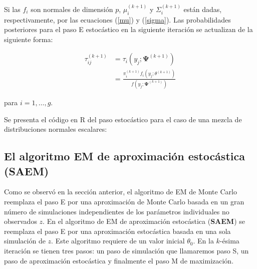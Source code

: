 \documentclass[
]{article}
\newenvironment{Shaded}{\begin{snugshade}}{\end{snugshade}}
\newcommand{\AttributeTok}[1]{\textcolor[rgb]{0.77,0.63,0.00}{#1}}
\newcommand{\ConstantTok}[1]{\textcolor[rgb]{0.00,0.00,0.00}{#1}}
\newcommand{\ControlFlowTok}[1]{\textcolor[rgb]{0.13,0.29,0.53}{\textbf{#1}}}
\newcommand{\DecValTok}[1]{\textcolor[rgb]{0.00,0.00,0.81}{#1}}
\newcommand{\FunctionTok}[1]{\textcolor[rgb]{0.00,0.00,0.00}{#1}}
\newcommand{\NormalTok}[1]{#1}
\newcommand{\OtherTok}[1]{\textcolor[rgb]{0.56,0.35,0.01}{#1}}
\newcommand{\SpecialCharTok}[1]{\textcolor[rgb]{0.00,0.00,0.00}{#1}}
\begin{document}
Si las \(f_i\) son normales de dimensión \(p\), \(\mu_{i}^{(k+1)}\) y
\(\Sigma_i^{(k+1)}\) están dadas, respectivamente, por las ecuaciones
(\ref{mu}) y (\ref{sigma}). Las probabilidades posteriores para el paso
E estocástico en la siguiente iteración se actualizan de la siguiente
forma:

\begin{align}
\tau_{ij}^{(k+1)}&=\tau_i(y_j;\bm{\Psi}^{(k+1)})\\
&=\frac{\pi_i^{(k+1)}f_i(y_j;\theta^{(k+1)})}{f(y_j;\bm{\Psi}^{(k+1)})}
\end{align}

para \(i=1,\ldots,g\).

Se presenta el código en R del paso estocástico para el caso de una
mezcla de distribuciones normales escalares:

\begin{Shaded}
\end{Shaded}

\subsection{El algoritmo EM de aproximación estocástica (SAEM)}

Como se observó en la sección anterior, el algoritmo de EM de Monte
Carlo reemplaza el paso E por una aproximación de Monte Carlo basada en
un gran número de simulaciones independientes de los parámetros
individuales no observados \(z\). En el algoritmo de EM de aproximación
estocástica (\textbf{SAEM}) se reemplaza el paso E por una aproximación
estocástica basada en una sola simulación de \(z\). Este algoritmo
requiere de un valor inicial \(\theta_0\). En la \(k\)-ésima iteración
se tienen tres pasos: un paso de simulación que llamaremos paso S, un
paso de aproximación estocástica y finalmente el paso M de maximización.
\end{document}
